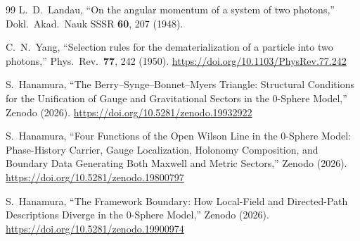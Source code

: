 \documentclass[%
 reprint, amsmath,amssymb, aps, prb, ]{revtex4-2}
\numberwithin{equation}{section}
\begin{document}
\begin{thebibliography}{99}
 L.~D.~Landau, ``On the angular momentum of a system of two photons,'' Dokl.\ Akad.\ Nauk SSSR \textbf{60}, 207 (1948).

 C.~N.~Yang, ``Selection rules for the dematerialization of a particle into two photons,'' Phys.\ Rev.\ \textbf{77}, 242 (1950). \href{https://doi.org/10.1103/PhysRev.77.242}{https://doi.org/10.1103/PhysRev.77.242}

 S.~Hanamura, ``The Berry--Synge--Bonnet--Myers Triangle: Structural Conditions for the Unification of Gauge and Gravitational Sectors in the 0-Sphere Model,'' Zenodo (2026). \href{https://doi.org/10.5281/zenodo.19932922}{https://doi.org/10.5281/zenodo.19932922}

 S.~Hanamura, ``Four Functions of the Open Wilson Line in the 0-Sphere Model: Phase-History Carrier, Gauge Localization, Holonomy Composition, and Boundary Data Generating Both Maxwell and Metric Sectors,'' Zenodo (2026). \href{https://doi.org/10.5281/zenodo.19800797}{https://doi.org/10.5281/zenodo.19800797}

 S.~Hanamura, ``The Framework Boundary: How Local-Field and Directed-Path Descriptions Diverge in the 0-Sphere Model,'' Zenodo (2026). \href{https://doi.org/10.5281/zenodo.19900974}{https://doi.org/10.5281/zenodo.19900974}

\end{thebibliography}
\end{document}
